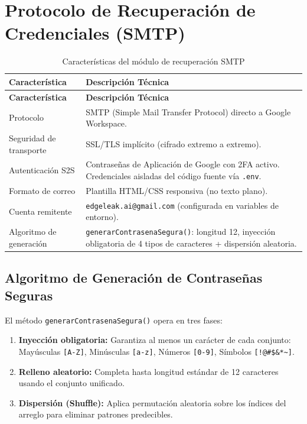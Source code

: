\documentclass[12pt,a4paper]{article}
\begin{document}
\section{Protocolo de Recuperación de Credenciales (SMTP)}

\begin{longtable}{p{4cm} p{9.5cm}}
\caption{Características del módulo de recuperación SMTP} \label{tab:smtp} \\
\toprule
\textbf{Característica} & \textbf{Descripción Técnica} \\
\midrule
\endfirsthead
\toprule
\textbf{Característica} & \textbf{Descripción Técnica} \\
\midrule
\endhead
\bottomrule
\endlastfoot
Protocolo & SMTP (Simple Mail Transfer Protocol) directo a Google Workspace. \\
Seguridad de transporte & SSL/TLS implícito (cifrado extremo a extremo). \\
Autenticación S2S & Contraseñas de Aplicación de Google con 2FA activo. Credenciales aisladas del código fuente vía \texttt{.env}. \\
Formato de correo & Plantilla HTML/CSS responsiva (no texto plano). \\
Cuenta remitente & \texttt{edgeleak.ai@gmail.com} (configurada en variables de entorno). \\
Algoritmo de generación & \texttt{generarContrasenaSegura()}: longitud 12, inyección obligatoria de 4 tipos de caracteres + dispersión aleatoria. \\
\end{longtable}

\subsection{Algoritmo de Generación de Contraseñas Seguras}

El método \texttt{generarContrasenaSegura()} opera en tres fases:

\begin{enumerate}[leftmargin=2em]
  \item \textbf{Inyección obligatoria:} Garantiza al menos un carácter de cada conjunto:
        Mayúsculas \texttt{[A-Z]}, Minúsculas \texttt{[a-z]}, Números \texttt{[0-9]},
        Símbolos \texttt{[!@\#\$\&*\textasciitilde]}.
  \item \textbf{Relleno aleatorio:} Completa hasta longitud estándar de 12 caracteres
        usando el conjunto unificado.
  \item \textbf{Dispersión (Shuffle):} Aplica permutación aleatoria sobre los índices del
        arreglo para eliminar patrones predecibles.
\end{enumerate}
\end{document}
